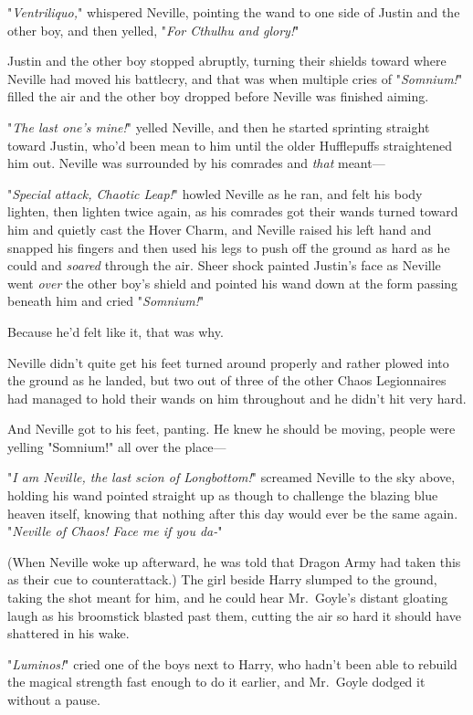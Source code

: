 "\emph{Ventriliquo,}" whispered Neville, pointing the wand to one side of Justin and the other boy, and then yelled, "\emph{For Cthulhu and glory!}"

Justin and the other boy stopped abruptly, turning their shields toward where Neville had moved his battlecry, and that was when multiple cries of "\emph{Somnium!}" filled the air and the other boy dropped before Neville was finished aiming.

"\emph{The last one's mine!}" yelled Neville, and then he started sprinting straight toward Justin, who'd been mean to him until the older Hufflepuffs straightened him out. Neville was surrounded by his comrades and \emph{that} meant---

"\emph{Special attack, Chaotic Leap!}" howled Neville as he ran, and felt his body lighten, then lighten twice again, as his comrades got their wands turned toward him and quietly cast the Hover Charm, and Neville raised his left hand and snapped his fingers and then used his legs to push off the ground as hard as he could and \emph{soared} through the air. Sheer shock painted Justin's face as Neville went \emph{over} the other boy's shield and pointed his wand down at the form passing beneath him and cried "\emph{Somnium!}"

Because he'd felt like it, that was why.

Neville didn't quite get his feet turned around properly and rather plowed into the ground as he landed, but two out of three of the other Chaos Legionnaires had managed to hold their wands on him throughout and he didn't hit very hard.

And Neville got to his feet, panting. He knew he should be moving, people were yelling "Somnium!" all over the place---

"\emph{I am Neville, the last scion of Longbottom!}" screamed Neville to the sky above, holding his wand pointed straight up as though to challenge the blazing blue heaven itself, knowing that nothing after this day would ever be the same again. "\emph{Neville of Chaos! Face me if you da-}"

(When Neville woke up afterward, he was told that Dragon Army had taken this as their cue to counterattack.)
\sbreak
The girl beside Harry slumped to the ground, taking the shot meant for him, and he could hear Mr.~Goyle's distant gloating laugh as his broomstick blasted past them, cutting the air so hard it should have shattered in his wake.

"\emph{Luminos!}" cried one of the boys next to Harry, who hadn't been able to rebuild the magical strength fast enough to do it earlier, and Mr.~Goyle dodged it without a pause.

